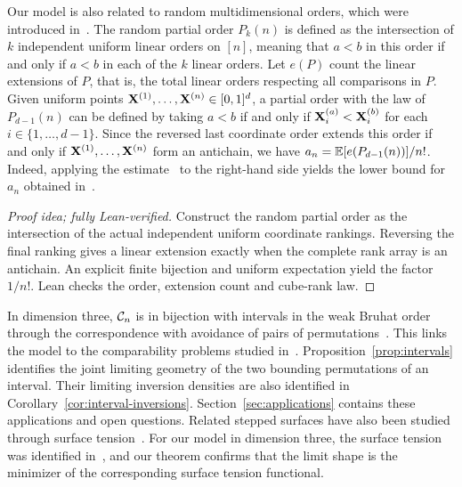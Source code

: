 \documentclass[11pt,letterpaper]{article}
\begin{document}
Our model is also related to random multidimensional orders, which were introduced in~\cite{winkler1985random}. The random partial order $P_k(n)$ is defined as the intersection of $k$ independent uniform
linear orders on $[n]$, meaning that $a<b$ in this order if and only if $a<b$ in each of the $k$ linear orders. Let $e(P)$ count the linear
extensions of $P$, that is, the total linear orders respecting all
comparisons in $P$. Given uniform points $\mathbf X^{(1)},\ldots,\mathbf X^{(n)}\in [0,1]^{d}$, a partial order with the law of $P_{d-1}(n)$ can be defined by taking $a<b$ if and only if $\mathbf X^{(a)}_{i}<\mathbf X^{(b)}_{i}$ for each $i\in\{1,\ldots,d-1\}$. Since the reversed last coordinate order
extends this order if and only if $\mathbf X^{(1)},\ldots,\mathbf X^{(n)}$ form an antichain, we have
$a_n=\mathbb E[e(P_{d-1}(n))]/n!$. Indeed, applying the estimate~\cite[Corollary~4]{Brightwell} to the right-hand side yields the lower bound for $a_n$ obtained in~\cite[Theorem~8.4]{CK}.

\begin{proof}[Proof idea; fully Lean-verified]
Construct the random partial order as the intersection of the actual independent uniform coordinate rankings. Reversing the final ranking gives a linear extension exactly when the complete rank array is an antichain. An explicit finite bijection and uniform expectation yield the factor $1/n!$. Lean checks the order, extension count and cube-rank law.
\end{proof}

In dimension three, $\mathcal C_n$ is in bijection with intervals in the weak Bruhat order through the correspondence with avoidance of pairs of permutations~\cite{GP,BM}. This links the model to the comparability problems studied in~\cite{HP,BCHHLM}. Proposition~\ref{prop:intervals} identifies the joint limiting geometry of the two bounding permutations of an interval.
Their limiting inversion densities are also identified in Corollary~\ref{cor:interval-inversions}. Section~\ref{sec:applications} contains these applications and open questions. Related stepped surfaces have also been studied through surface tension~\cite{Sheffield}. For our model in dimension three, the surface tension was identified in~\cite{KenyonComm}, and our theorem confirms that the limit shape is the minimizer of the corresponding surface tension functional.

\end{document}
